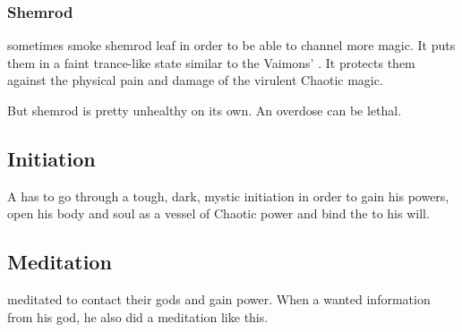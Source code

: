 \subsubsection{Shemrod}
\Rethyaxes{} sometimes smoke shemrod leaf in order to be able to channel more magic. 
It puts them in a faint trance-like state similar to the Vaimons' . 
It protects them against the physical pain and damage of the virulent Chaotic magic. 

But shemrod is pretty unhealthy on its own. 
An overdose can be lethal. 









\subsection{Initiation}
A \rethyax{} has to go through a tough, dark, mystic initiation in order to gain his powers, open his body and soul as a vessel of Chaotic power and bind the  to his will. 










\subsection{Meditation}
\Rethyaxes meditated to contact their gods and gain power. 
When a \rethyax wanted information from his god, he also did a meditation like this. 

